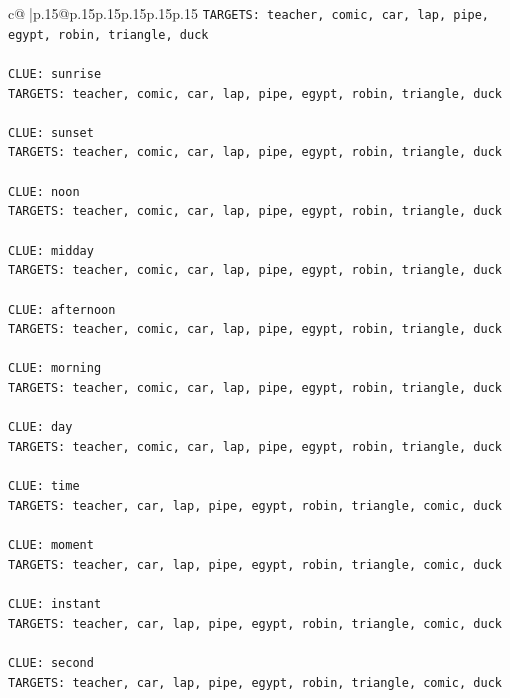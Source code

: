 \documentclass{article}
\begin{document}
{\begin{supertabular}{c@{$\;$}|p{.15\linewidth}@{}p{.15\linewidth}p{.15\linewidth}p{.15\linewidth}p{.15\linewidth}p{.15\linewidth}}
{{{\texttt{TARGETS: teacher, comic, car, lap, pipe, egypt, robin, triangle, duck} \\
\\ 
\texttt{CLUE: sunrise} \\
\texttt{TARGETS: teacher, comic, car, lap, pipe, egypt, robin, triangle, duck} \\
\\ 
\texttt{CLUE: sunset} \\
\texttt{TARGETS: teacher, comic, car, lap, pipe, egypt, robin, triangle, duck} \\
\\ 
\texttt{CLUE: noon} \\
\texttt{TARGETS: teacher, comic, car, lap, pipe, egypt, robin, triangle, duck} \\
\\ 
\texttt{CLUE: midday} \\
\texttt{TARGETS: teacher, comic, car, lap, pipe, egypt, robin, triangle, duck} \\
\\ 
\texttt{CLUE: afternoon} \\
\texttt{TARGETS: teacher, comic, car, lap, pipe, egypt, robin, triangle, duck} \\
\\ 
\texttt{CLUE: morning} \\
\texttt{TARGETS: teacher, comic, car, lap, pipe, egypt, robin, triangle, duck} \\
\\ 
\texttt{CLUE: day} \\
\texttt{TARGETS: teacher, comic, car, lap, pipe, egypt, robin, triangle, duck} \\
\\ 
\texttt{CLUE: time} \\
\texttt{TARGETS: teacher, car, lap, pipe, egypt, robin, triangle, comic, duck} \\
\\ 
\texttt{CLUE: moment} \\
\texttt{TARGETS: teacher, car, lap, pipe, egypt, robin, triangle, comic, duck} \\
\\ 
\texttt{CLUE: instant} \\
\texttt{TARGETS: teacher, car, lap, pipe, egypt, robin, triangle, comic, duck} \\
\\ 
\texttt{CLUE: second} \\
\texttt{TARGETS: teacher, car, lap, pipe, egypt, robin, triangle, comic, duck} \\
}}}
\end{supertabular}}
\end{document}
